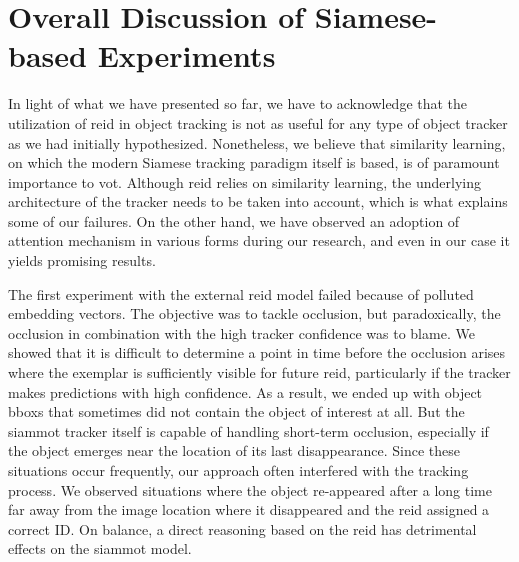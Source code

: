 \section{Overall Discussion of Siamese-based Experiments}
\label{sec:ExperimentsDisucssion}

In light of what we have presented so far, we have to acknowledge that the utilization of \gls{reid} in object tracking is not as useful for any type of object tracker as we had initially hypothesized. Nonetheless, we believe that similarity learning, on which the modern Siamese tracking paradigm itself is based, is of paramount importance to \gls{vot}. Although \gls{reid} relies on similarity learning, the underlying architecture of the tracker needs to be taken into account, which is what explains some of our failures. On the other hand, we have observed an adoption of attention mechanism in various forms during our research, and even in our case it yields promising results.

The first experiment with the external \gls{reid} model failed because of polluted embedding vectors. The objective was to tackle occlusion, but paradoxically, the occlusion in combination with the high tracker confidence was to blame. We showed that it is difficult to determine a point in time before the occlusion arises where the exemplar is sufficiently visible for future \gls{reid}, particularly if the tracker makes predictions with high confidence. As a result, we ended up with object \glspl{bbox} that sometimes did not contain the object of interest at all. But the \gls{siammot} tracker itself is capable of handling short-term occlusion, especially if the object emerges near the location of its last disappearance. Since these situations occur frequently, our approach often interfered with the tracking process. We observed situations where the object re-appeared after a long time far away from the image location where it disappeared and the \gls{reid} assigned a correct ID. On balance, a direct reasoning based on the \gls{reid} has detrimental effects on the \gls{siammot} model.

